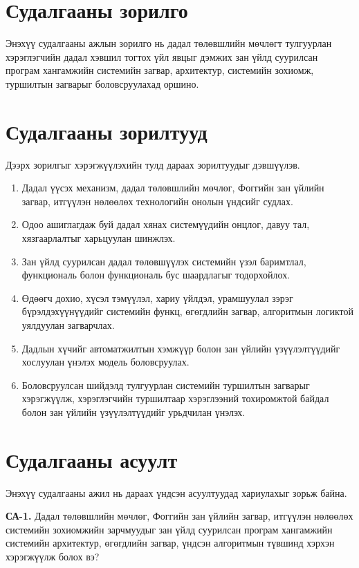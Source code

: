 \section{Судалгааны зорилго}

Энэхүү судалгааны ажлын зорилго нь дадал төлөвшлийн мөчлөгт тулгуурлан хэрэглэгчийн дадал хэвшил тогтох үйл явцыг дэмжих зан үйлд суурилсан програм хангамжийн системийн загвар, архитектур, системийн зохиомж, туршилтын загварыг боловсруулахад оршино.

\section{Судалгааны зорилтууд}

Дээрх зорилгыг хэрэгжүүлэхийн тулд дараах зорилтуудыг дэвшүүлэв.

\begin{enumerate}
    \item Дадал үүсэх механизм, дадал төлөвшлийн мөчлөг, Фоггийн зан үйлийн загвар, итгүүлэн нөлөөлөх технологийн онолын үндсийг судлах.
    \item Одоо ашиглагдаж буй дадал хянах системүүдийн онцлог, давуу тал, хязгаарлалтыг харьцуулан шинжлэх.
    \item Зан үйлд суурилсан дадал төлөвшүүлэх системийн үзэл баримтлал, функциональ болон функциональ бус шаардлагыг тодорхойлох.
    \item Өдөөгч дохио, хүсэл тэмүүлэл, хариу үйлдэл, урамшуулал зэрэг бүрэлдэхүүнүүдийг системийн функц, өгөгдлийн загвар, алгоритмын логиктой уялдуулан загварчлах.
    \item Дадлын хүчийг автоматжилтын хэмжүүр болон зан үйлийн үзүүлэлтүүдийг хослуулан үнэлэх модель боловсруулах.
    \item Боловсруулсан шийдэлд тулгуурлан системийн туршилтын загварыг хэрэгжүүлж, хэрэглэгчийн туршилтаар хэрэглээний тохиромжтой байдал болон зан үйлийн үзүүлэлтүүдийг урьдчилан үнэлэх.
\end{enumerate}

\section{Судалгааны асуулт}

Энэхүү судалгааны ажил нь дараах үндсэн асуултуудад хариулахыг зорьж байна.

\textbf{СА-1.} Дадал төлөвшлийн мөчлөг, Фоггийн зан үйлийн загвар, итгүүлэн нөлөөлөх системийн зохиомжийн зарчмуудыг зан үйлд суурилсан програм хангамжийн системийн архитектур, өгөгдлийн загвар, үндсэн алгоритмын түвшинд хэрхэн хэрэгжүүлж болох вэ?

